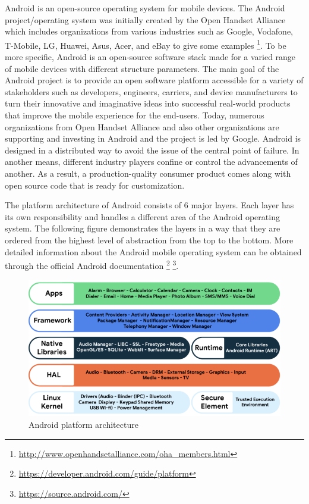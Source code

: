 Android is an open-source operating system for mobile devices. The Android project/operating system was initially created by the Open Handset Alliance which includes organizations from various industries such as Google, Vodafone, T-Mobile, LG, Huawei, Asus, Acer, and eBay to give some examples \footnote{\url{http://www.openhandsetalliance.com/oha_members.html}}. To be more specific, Android is an open-source software stack made for a varied range of mobile devices with different structure parameters. The main goal of the Android project is to provide an open software platform accessible for a variety of stakeholders such as developers, engineers, carriers, and device manufacturers to turn their innovative and imaginative ideas into successful real-world products that improve the mobile experience for the end-users. Today, numerous organizations from Open Handset Alliance and also other organizations are supporting and investing in Android and the project is led by Google. Android is designed in a distributed way to avoid the issue of the central point of failure. In another means, different industry players confine or control the advancements of another. As a result, a production-quality consumer product comes along with open source code that is ready for customization.

The platform architecture of Android consists of 6 major layers. Each layer has its own responsibility and handles a different area of the Android operating system. The following figure demonstrates the layers in a way that they are ordered from the highest level of abstraction from the top to the bottom. More detailed information about the Android mobile operating system can be obtained through the official Android documentation \footnote{\url{https://developer.android.com/guide/platform}} \footnote{\url{https://source.android.com/}}.
\begin{figure}
    \centering
    \includegraphics[scale=0.5]{figures/android_os.png}
    \caption{Android platform architecture}
    \label{fig:android_platform_architecture}
\end{figure}

